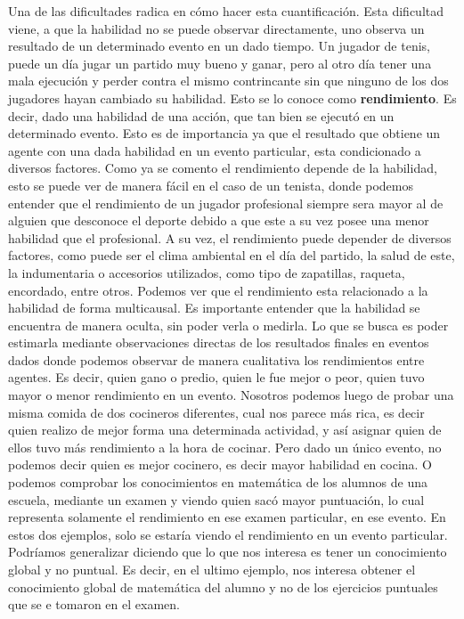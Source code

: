 \documentclass[11pt,twoside, spanish]{report} %
\begin{document}
Una de las dificultades radica en c\'omo hacer esta cuantificaci\'on.
Esta dificultad viene, a que la habilidad no se puede observar directamente, uno observa un resultado de un determinado evento en un dado tiempo.
Un jugador de tenis, puede un d\'ia jugar un partido muy bueno y ganar, pero al otro d\'ia tener una mala ejecuci\'on y perder contra el mismo contrincante sin que ninguno de los dos jugadores hayan cambiado su habilidad.
Esto se lo conoce como \textbf{rendimiento}.
Es decir, dado una habilidad de una acci\'on, que tan bien se ejecut\'o en un determinado evento.
Esto es de importancia ya que el resultado que obtiene un agente con una dada habilidad en un evento particular, esta condicionado a diversos factores.
Como ya se comento el rendimiento depende de la habilidad, esto se puede ver de manera f\'acil en el caso de un tenista, donde podemos entender que el rendimiento de un jugador profesional siempre sera mayor al de alguien que desconoce el deporte debido a que este a su vez posee una menor habilidad que el profesional.
A su vez, el rendimiento puede depender de diversos factores, como puede ser el clima ambiental en el d\'ia del partido, la salud de este, la indumentaria o accesorios utilizados, como tipo de zapatillas, raqueta, encordado, entre otros.
Podemos ver que el rendimiento esta relacionado a la habilidad de forma multicausal.
Es importante entender que la habilidad se encuentra de manera oculta, sin poder verla o medirla.
Lo que se busca es poder estimarla mediante observaciones directas de los resultados finales en eventos dados donde podemos observar de manera cualitativa los rendimientos entre agentes.
Es decir, quien gano o predio, quien le fue mejor o peor, quien tuvo mayor o menor rendimiento en un evento.
Nosotros podemos luego de probar una misma comida de dos cocineros diferentes, cual nos parece m\'as rica, es decir quien realizo de mejor forma una determinada actividad, y as\'i asignar quien de ellos tuvo m\'as rendimiento a la hora de cocinar.
Pero dado un \'unico evento, no podemos decir quien es mejor cocinero, es decir mayor habilidad en cocina.
O podemos comprobar los conocimientos en matem\'atica de los alumnos de una escuela, mediante un examen y viendo quien sac\'o mayor puntuaci\'on, lo cual representa solamente el rendimiento en ese examen particular, en ese evento.
En estos dos ejemplos, solo se estar\'ia viendo el rendimiento en un evento particular.
Podr\'iamos generalizar diciendo que lo que nos interesa es tener un conocimiento global y no puntual.
Es decir, en el ultimo ejemplo, nos interesa obtener el conocimiento global de matem\'atica del alumno y no de los ejercicios puntuales que se e tomaron en el examen.
\end{document}
